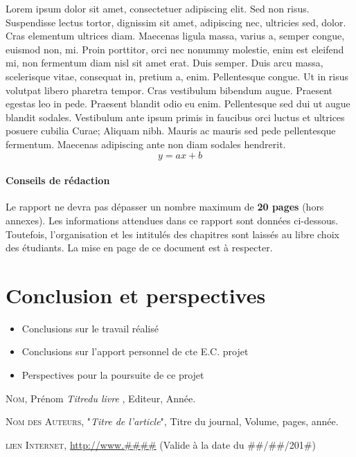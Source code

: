 \documentclass[a4paper, 12pt]{report} %
\begin{document}
	Lorem ipsum dolor sit amet, consectetuer adipiscing elit. Sed non risus. Suspendisse lectus tortor, dignissim sit amet, adipiscing nec, ultricies sed, dolor. Cras elementum ultrices diam. Maecenas ligula massa, varius a, semper congue, euismod non, mi. Proin porttitor, orci nec nonummy molestie, enim est eleifend mi, non fermentum diam nisl sit amet erat. Duis semper. Duis arcu massa, scelerisque vitae, consequat in, pretium a, enim. Pellentesque congue. Ut in risus volutpat libero pharetra tempor. Cras vestibulum bibendum augue. Praesent egestas leo in pede. Praesent blandit odio eu enim. Pellentesque sed dui ut augue blandit sodales. Vestibulum ante ipsum primis in faucibus orci luctus et ultrices posuere cubilia Curae; Aliquam nibh. Mauris ac mauris sed pede pellentesque fermentum. Maecenas adipiscing ante non diam sodales hendrerit.\\

\begin{equation}
	y = a x + b
\end{equation}

				\subsubsection{Conseils de rédaction}

	Le rapport ne devra pas dépasser un nombre maximum de \textbf{20 pages} (hors annexes). Les informations attendues dans ce rapport sont données ci-dessous. Toutefois, l’organisation et les intitulés des chapitres sont laissés au libre choix des étudiants. La mise en page de ce document est à respecter. 

	\chapter*{Conclusion et perspectives}		%
\begin{itemize}
\item Conclusions sur le travail réalisé
\item Conclusions sur l'apport personnel de cte E.C. projet
\item Perspectives pour la poursuite de ce projet
\end{itemize}

\begin{thebibliography}{9}

		\textsc{Nom}, Prénom
		\textit{Titredu livre },
		Editeur, Année.

		\textsc{Nom des Auteurs},
		"\textit{Titre de l'article}",
		Titre du journal,
		Volume, pages, année.

\textsc{lien Internet},
		\url{http://www.\#\#\#\#}
		(Valide à la date du \#\#/\#\#/201\#)

\end{thebibliography}
\end{document}
